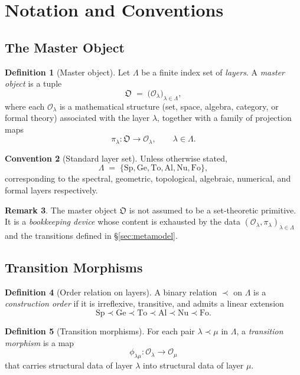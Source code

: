 \documentclass[11pt,a4paper]{article}
\theoremstyle{definition}
\newtheorem{definition}{Definition}[section]
\newtheorem{remark}[definition]{Remark}
\newtheorem{convention}[definition]{Convention}
\theoremstyle{plain}
\newcommand{\Lam}{\Lambda}
\newcommand{\Sp}{\mathrm{Sp}}
\newcommand{\Ge}{\mathrm{Ge}}
\newcommand{\To}{\mathrm{To}}
\newcommand{\Al}{\mathrm{Al}}
\newcommand{\Nu}{\mathrm{Nu}}
\newcommand{\Fo}{\mathrm{Fo}}
\newcommand{\Ob}{\mathfrak{O}}
\newcommand{\Ocal}{\mathcal{O}}
\newcommand{\philam}{\phi_{\lambda\mu}}
\begin{document}
\section{Notation and Conventions}\label{sec:notation}

\subsection{The Master Object}

\begin{definition}[Master object]
Let $\Lam$ be a finite index set of \emph{layers}. A \emph{master
object} is a tuple
\[
  \Ob \;=\; \bigl(\Ocal_\lambda\bigr)_{\lambda \in \Lam},
\]
where each $\Ocal_\lambda$ is a mathematical structure (set, space,
algebra, category, or formal theory) associated with the layer
$\lambda$, together with a family of projection maps
\[
  \pi_\lambda : \Ob \longrightarrow \Ocal_\lambda,
  \qquad \lambda \in \Lam .
\]
\end{definition}

\begin{convention}[Standard layer set]
Unless otherwise stated,
\[
  \Lam \;=\; \{\Sp,\Ge,\To,\Al,\Nu,\Fo\},
\]
corresponding to the spectral, geometric, topological, algebraic,
numerical, and formal layers respectively.
\end{convention}

\begin{remark}
The master object $\Ob$ is not assumed to be a set-theoretic
primitive. It is a \emph{bookkeeping device} whose content is
exhausted by the data $(\Ocal_\lambda, \pi_\lambda)_{\lambda \in \Lam}$
and the transitions defined in \S\ref{sec:metamodel}.
\end{remark}

\subsection{Transition Morphisms}

\begin{definition}[Order relation on layers]
A binary relation $\prec$ on $\Lam$ is a \emph{construction order} if
it is irreflexive, transitive, and admits a linear extension
\[
  \Sp \prec \Ge \prec \To \prec \Al \prec \Nu \prec \Fo .
\]
\end{definition}

\begin{definition}[Transition morphisms]
For each pair $\lambda \prec \mu$ in $\Lam$, a \emph{transition
morphism} is a map
\[
  \philam : \Ocal_\lambda \longrightarrow \Ocal_\mu
\]
that carries structural data of layer $\lambda$ into structural data
of layer $\mu$.
\end{definition}
\end{document}
